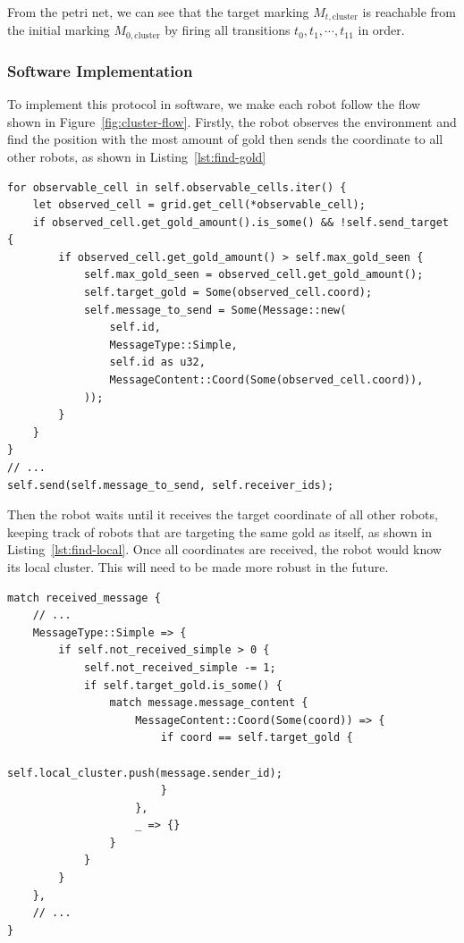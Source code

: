 \documentclass[12pt,a4paper]{article}
\begin{document}
From the petri net, we can see that the target marking $M_{t, \text{cluster}}$ is reachable from the initial marking $M_{0, \text{cluster}}$ by firing all transitions $t_0, t_1, \cdots, t_{11}$ in order.

\subsubsection{Software Implementation}
To implement this protocol in software, we make each robot follow the flow shown in Figure~\ref{fig:cluster-flow}. Firstly, the robot observes the environment and find the position with the most amount of gold then sends the coordinate to all other robots, as shown in Listing~\ref{lst:find-gold}
\begin{lstlisting}[float, caption={Robot Observes and Find where the most Gold is}, label={lst:find-gold}]
for observable_cell in self.observable_cells.iter() {
    let observed_cell = grid.get_cell(*observable_cell);
    if observed_cell.get_gold_amount().is_some() && !self.send_target {
        if observed_cell.get_gold_amount() > self.max_gold_seen {
            self.max_gold_seen = observed_cell.get_gold_amount();
            self.target_gold = Some(observed_cell.coord);
            self.message_to_send = Some(Message::new(
                self.id,
                MessageType::Simple,
                self.id as u32,
                MessageContent::Coord(Some(observed_cell.coord)),
            ));
        }
    }
}
// ...
self.send(self.message_to_send, self.receiver_ids);
\end{lstlisting}
Then the robot waits until it receives the target coordinate of all other robots, keeping track of robots that are targeting the same gold as itself, as shown in Listing~\ref{lst:find-local}. Once all coordinates are received, the robot would know its local cluster. This will need to be made more robust in the future.
\begin{lstlisting}[float, caption={Robot Receives Target Gold Coordinates and Keep Track of Local Cluster}, label={lst:find-local}]
match received_message {
    // ...
    MessageType::Simple => {
        if self.not_received_simple > 0 {
            self.not_received_simple -= 1;
            if self.target_gold.is_some() {
                match message.message_content {
                    MessageContent::Coord(Some(coord)) => {
                        if coord == self.target_gold {
                            self.local_cluster.push(message.sender_id);
                        }
                    },
                    _ => {}
                }
            }
        }
    },
    // ...
}

\end{lstlisting}
\end{document}
